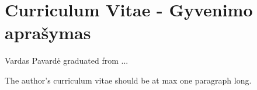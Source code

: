 \chapter*{Curriculum Vitae - Gyvenimo aprašymas}
\label{cha:cv}


Vardas Pavardė graduated from ... 

The author's curriculum vitae should be at max one paragraph long.